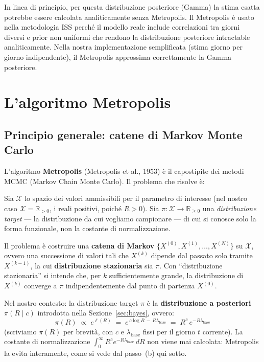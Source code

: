 \documentclass[12pt,a4paper]{article}
\newcommand{\lbase}{\lambda_{\mathrm{base}}}
\begin{document}
\begin{osservazione}
In linea di principio, per questa distribuzione posteriore (Gamma) la stima esatta
potrebbe essere calcolata analiticamente senza Metropolis. Il Metropolis è usato
nella metodologia ISS perché il modello reale include correlazioni tra giorni diversi
e prior non uniformi che rendono la distribuzione posteriore intractable analiticamente.
Nella nostra implementazione semplificata (stima giorno per giorno indipendente),
il Metropolis approssima correttamente la Gamma posteriore.
\end{osservazione}

\section{L'algoritmo Metropolis}
\label{sec:metro}

\subsection{Principio generale: catene di Markov Monte Carlo}

L'algoritmo \textbf{Metropolis} (Metropolis et al., 1953) è il capostipite dei metodi
MCMC (Markov Chain Monte Carlo). Il problema che risolve è:

\begin{definizione}
Sia $\mathcal{X}$ lo spazio dei valori ammissibili per il parametro di interesse
(nel nostro caso $\mathcal{X} = \mathbb{R}_{>0}$, i reali positivi, poiché $R > 0$).
Sia $\pi: \mathcal{X} \to \mathbb{R}_{\ge 0}$ una \emph{distribuzione target} ---
la distribuzione da cui vogliamo campionare --- di cui si conosce solo la forma
funzionale, non la costante di normalizzazione.

Il problema è costruire una \textbf{catena di Markov}
$\{X^{(0)}, X^{(1)}, \ldots, X^{(N)}\}$ su $\mathcal{X}$, ovvero una successione
di valori tali che $X^{(k)}$ dipende dal passato solo tramite $X^{(k-1)}$, la cui
\textbf{distribuzione stazionaria} sia $\pi$. Con ``distribuzione stazionaria''
si intende che, per $k$ sufficientemente grande, la distribuzione di $X^{(k)}$
converge a $\pi$ indipendentemente dal punto di partenza $X^{(0)}$.
\end{definizione}

Nel nostro contesto: la distribuzione target $\pi$ è la \textbf{distribuzione a
posteriori} $\pi(R \mid c)$ introdotta nella Sezione~\ref{sec:bayes}, ovvero:
\begin{equation}
  \pi(R) \;\propto\; e^{\ell(R)} \;=\; e^{\,c\log R\,-\,R\lbase} \;=\; R^c\,e^{-R\lbase}
\end{equation}
(scriviamo $\pi(R)$ per brevità, con $c$ e $\lbase$ fissi per il giorno $t$ corrente).
La costante di normalizzazione $\int_0^\infty R^c e^{-R\lbase}\,dR$ non viene mai
calcolata: Metropolis la evita interamente, come si vede dal passo~(b) qui sotto.
\end{document}
